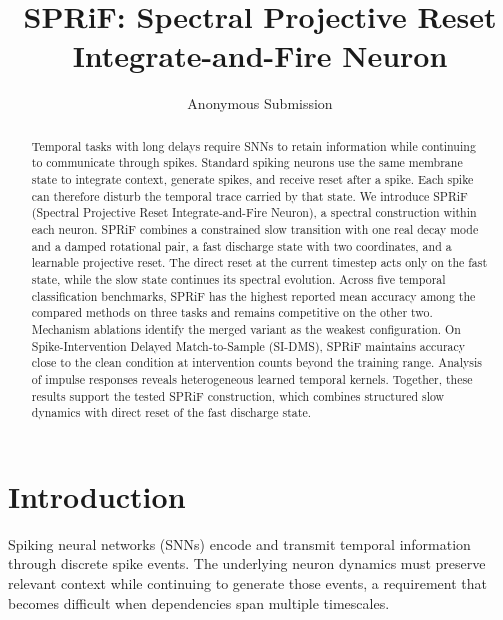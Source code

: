 \documentclass[letterpaper]{article} %
\title{SPRiF: Spectral Projective Reset Integrate-and-Fire Neuron}
\author{
    Anonymous Submission
}
\begin{document}
\maketitle


\begin{abstract}
Temporal tasks with long delays require SNNs to retain information while continuing to communicate through spikes. Standard spiking neurons use the same membrane state to integrate context, generate spikes, and receive reset after a spike. Each spike can therefore disturb the temporal trace carried by that state. We introduce SPRiF (Spectral Projective Reset Integrate-and-Fire Neuron), a spectral construction within each neuron. SPRiF combines a constrained slow transition with one real decay mode and a damped rotational pair, a fast discharge state with two coordinates, and a learnable projective reset. The direct reset at the current timestep acts only on the fast state, while the slow state continues its spectral evolution. Across five temporal classification benchmarks, SPRiF has the highest reported mean accuracy among the compared methods on three tasks and remains competitive on the other two. Mechanism ablations identify the merged variant as the weakest configuration. On Spike-Intervention Delayed Match-to-Sample (SI-DMS), SPRiF maintains accuracy close to the clean condition at intervention counts beyond the training range. Analysis of impulse responses reveals heterogeneous learned temporal kernels. Together, these results support the tested SPRiF construction, which combines structured slow dynamics with direct reset of the fast discharge state.
\end{abstract}


\section{Introduction}

Spiking neural networks (SNNs) encode and transmit temporal information through discrete spike events. The underlying neuron dynamics must preserve relevant context while continuing to generate those events, a requirement that becomes difficult when dependencies span multiple timescales.
\end{document}
